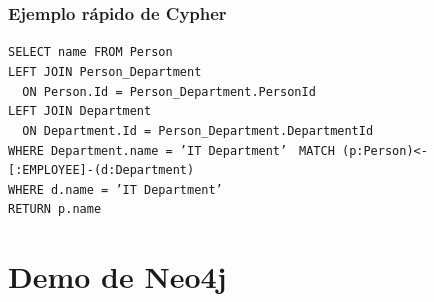 \begin{frame}
\frametitle{Ejemplo rápido de Cypher}
\footnotesize

\texttt{SELECT name FROM Person					\\
	LEFT JOIN Person\_Department				\\
	~~ON Person.Id = Person\_Department.PersonId		\\
	LEFT JOIN Department					\\
	~~ON Department.Id = Person\_Department.DepartmentId	\\
	WHERE Department.name = 'IT Department'
}
\vspace{5mm}
\pause
\texttt{MATCH (p:Person)<-[:EMPLOYEE]-(d:Department)		\\
	WHERE d.name = 'IT Department'				\\
	RETURN p.name
}

\end{frame}

\section{Demo de Neo4j}
